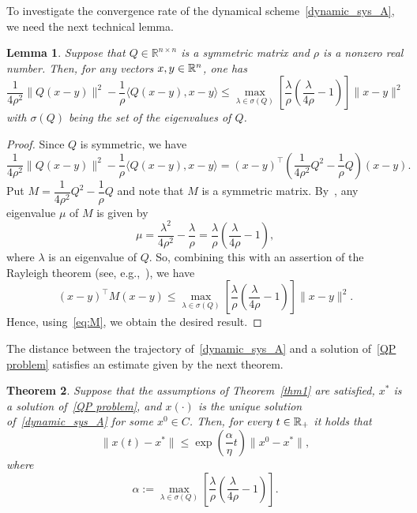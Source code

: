 \documentclass[11pt]{article}
\newtheorem{theorem}{Theorem}
\newtheorem{lemma}[theorem]{Lemma}
\theoremstyle{definition}
\theoremstyle{remark}
\def\R{\Bbb R}
\begin{document}
\medskip
To investigate the convergence rate of the dynamical scheme~\eqref{dynamic_sys_A}, we need the next technical lemma.

\begin{lemma}\label{lem:quadratic_bound}
	Suppose that $Q\in\mathbb R^{n\times n}$  is a symmetric matrix and $\rho$ is a nonzero real number. Then, for any vectors  $x, y\in \R^n$, one has
	\begin{equation}\label{auxiliary_estimate_Q}
	\frac{1}{4\rho^2} \|Q(x-y)\|^2 - \frac{1}{\rho}\langle Q(x-y), x-y\rangle \leq \max_{\lambda \in \sigma(Q)} \left[ \frac{\lambda}{\rho} \left( \frac{\lambda}{4\rho} - 1 \right) \right] \|x - y\|^2
	\end{equation}
	with $\sigma(Q)$ being the set of the eigenvalues of $Q$.
\end{lemma}

\begin{proof}
Since $Q$ is symmetric, we have
	\begin{equation}\label{eq:M}
		\frac{1}{4\rho^2} \|Q(x-y)\|^2 - \frac{1}{\rho}\langle Q(x-y), x-y\rangle = (x-y)^\top \left( \frac{1}{4\rho^2} Q^2 - \frac{1}{\rho} Q \right) (x-y).
	\end{equation}
	Put $M = \dfrac{1}{4\rho^2} Q^2 - \dfrac{1}{\rho} Q$ and note that $M$ is a symmetric matrix. By~\cite[Theorem~1.1.6]{HJ_2002}, any eigenvalue $\mu$ of $M$ is given by 
	\begin{equation*}
		\mu = \frac{\lambda^2}{4\rho^2} - \frac{\lambda}{\rho}=\frac{\lambda}{\rho} \left( \frac{\lambda}{4\rho} - 1 \right),
	\end{equation*}
	where $\lambda$ is an eigenvalue of $Q$. So, combining this with an assertion of the Rayleigh theorem (see, e.g.,~\cite[Theorem~4.2.2(c)]{HJ_2002}), we have
	\begin{equation*}
 (x-y)^\top M (x-y)\leq \max_{\lambda \in \sigma(Q)} \left[ \frac{\lambda}{\rho} \left( \frac{\lambda}{4\rho} - 1 \right) \right] \|x - y\|^2.
	\end{equation*}
Hence, using~\eqref{eq:M}, we obtain the desired result.
\end{proof}

The distance between the trajectory of~\eqref{dynamic_sys_A} and a solution of~\eqref{QP problem} satisfies an estimate given by the next theorem.


\begin{theorem}\label{thm2}
Suppose that the assumptions of Theorem~\ref{thm1} are satisfied, $x^*$ is a solution of~\eqref{QP problem}, and $x(\cdot)$ is the unique solution of~\eqref{dynamic_sys_A} for some $x^0\in C$. Then, for every $t\in \R_+$ it holds that 
\begin{equation}\label{sol_bound}
\|x(t)-x^*\|\leq \exp\left(\dfrac{\alpha}{\eta} t\right)\|x^0-x^*\|,
\end{equation}
where \begin{equation}\label{alpha}\alpha := \max\limits_{\lambda \in \sigma(Q)} \left[ \frac{\lambda}{\rho} \left( \frac{\lambda}{4\rho} - 1 \right)\right].
\end{equation}
\end{theorem}
\end{document}
